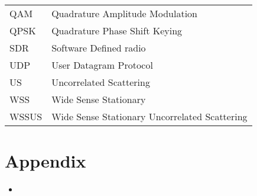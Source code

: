 \documentclass[
	overfullrule,
	paper = a4, twoside, openright, BCOR = 5mm,
	headinclude, footexclude,
	fontsize = 11pt,
	cleardoublepage = empty,
	titlepage, abstract = on,
	automark,
	numbers = noenddot
]{scrreprt}
\begin{document}
\begin{tabularx}{\linewidth}{l X}
		QAM    & Quadrature Amplitude Modulation                  \\
		QPSK   & Quadrature Phase Shift Keying                    \\
		SDR    & Software Defined radio                           \\
		UDP    & User Datagram Protocol                           \\
		US     & Uncorrelated Scattering                          \\
		WSS    & Wide Sense Stationary                            \\
		WSSUS  & Wide Sense Stationary Uncorrelated Scattering    \\
		\bottomrule
	\end{tabularx}

	\cleardoublepage

	\hypersetup{pageanchor = true}
	\setcounter{page}{1}
	\pagestyle{scrheadings}

	
	
	
	

	\printskelnotes
	\printbibliography

	\appendix
	\chapter{Appendix}

	\begin{itemize}
		\item
	\end{itemize}
\end{document}
